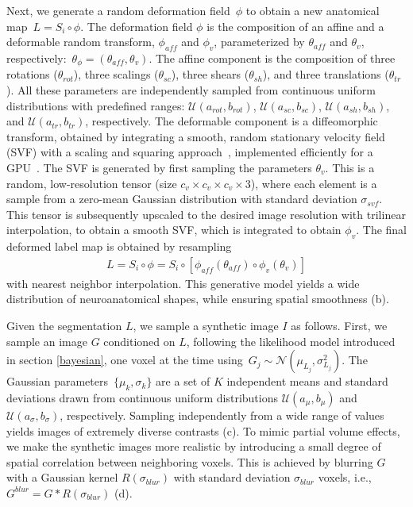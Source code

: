 \documentclass{midl}
\begin{document}
Next, we generate a random deformation field~$\phi$ to obtain a new anatomical map~\mbox{$L = S_i \circ \phi$}. The deformation field $\phi$ is the composition of an affine and a deformable random transform, $\phi_{aff}$ and $\phi_{v}$, parameterized by $\theta_{aff}$ and $\theta_v$, respectively:~$\theta_\phi=(\theta_{aff},\theta_v)$. The affine component is the composition of three rotations ($\theta_{rot}$), three scalings ($\theta_{sc}$), three shears ($\theta_{sh}$), and three translations ($\theta_{tr}$). All these parameters are independently sampled from 
continuous uniform distributions with predefined ranges: $\mathcal{U}(a_{rot},b_{rot})$, 
$\mathcal{U}(a_{sc},b_{sc})$,
$\mathcal{U}(a_{sh},b_{sh})$, 
and $\mathcal{U}(a_{tr},b_{tr})$, respectively.
The deformable component is a diffeomorphic transform, obtained by integrating a smooth, random stationary velocity field (SVF) with a scaling and squaring approach~\cite{moler_nineteen_2003,arsigny_log-euclidean_2006}, implemented efficiently for a GPU~\cite{dalca_unsupervised_2019-1,krebs_learning_2019}. The SVF is generated by first sampling the parameters $\theta_v$. This is a random, low-resolution tensor (size $c_v \times c_v \times c_v \times3$), where each element is a sample from a zero-mean Gaussian distribution with standard deviation $\sigma_{svf}$. This tensor is subsequently upscaled to the desired image resolution with trilinear interpolation, to obtain a smooth SVF, which is  integrated to obtain $\phi_v$. The final deformed label map is obtained by resampling
\begin{align}
L = S_i \circ \phi =  S_i \circ [\phi_{aff}(\theta_{aff})\circ \phi_v(\theta_v)]
\end{align}
with nearest neighbor interpolation. This generative model yields a wide distribution of neuroanatomical shapes, while ensuring spatial smoothness (b).

Given the segmentation $L$, we sample a synthetic image $I$ as follows. First, we sample an image $G$ conditioned on $L$, following the likelihood model introduced in section \ref{bayesian}, one voxel at the time using~$G_j \sim \mathcal{N}(\mu_{L_j}, \sigma_{L_j}^2)$. The Gaussian parameters~$\{\mu_k, \sigma_k\}$ are a set of $K$ independent means and standard deviations drawn from continuous uniform distributions $\mathcal{U}(a_\mu,b_\mu)$ and $\mathcal{U}(a_\sigma,b_\sigma)$, respectively. Sampling independently from a wide range of values yields images of extremely diverse contrasts (c). To mimic  partial volume effects, we make the synthetic images more realistic by introducing a small degree of spatial correlation between neighboring voxels. This is achieved by blurring $G$ with a Gaussian kernel $R(\sigma_{blur})$ with standard deviation $\sigma_{blur}$ voxels, i.e., $G^{blur} = G * R(\sigma_{blur})$ (d).
\end{document}
